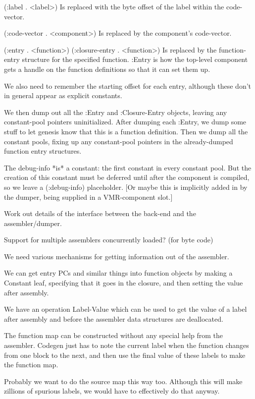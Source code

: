     (:label . <label>)
        Is replaced with the byte offset of the label within the code-vector.

    (:code-vector . <component>)
        Is replaced by the component's code-vector.

    (:entry . <function>)
    (:closure-entry . <function>)
	Is replaced by the function-entry structure for the specified function.
	:Entry is how the top-level component gets a handle on the function
	definitions so that it can set them up.

We also need to remember the starting offset for each entry, although these
don't in general appear as explicit constants.

We then dump out all the :Entry and :Closure-Entry objects, leaving any
constant-pool pointers uninitialized.  After dumping each :Entry, we dump some
stuff to let genesis know that this is a function definition.  Then we dump all
the constant pools, fixing up any constant-pool pointers in the already-dumped
function entry structures.

The debug-info *is* a constant: the first constant in every constant pool.  But
the creation of this constant must be deferred until after the component is
compiled, so we leave a (:debug-info) placeholder.  [Or maybe this is
implicitly added in by the dumper, being supplied in a VMR-component slot.]


    Work out details of the interface between the back-end and the
    assembler/dumper.

    Support for multiple assemblers concurrently loaded?  (for byte code)
    
    We need various mechanisms for getting information out of the assembler.

    We can get entry PCs and similar things into function objects by making a
    Constant leaf, specifying that it goes in the closure, and then
    setting the value after assembly.

    We have an operation Label-Value which can be used to get the value of a
    label after assembly and before the assembler data structures are
    deallocated.

    The function map can be constructed without any special help from the
    assembler.  Codegen just has to note the current label when the function
    changes from one block to the next, and then use the final value of these
    labels to make the function map.

    Probably we want to do the source map this way too.  Although this will
    make zillions of spurious labels, we would have to effectively do that
    anyway.

